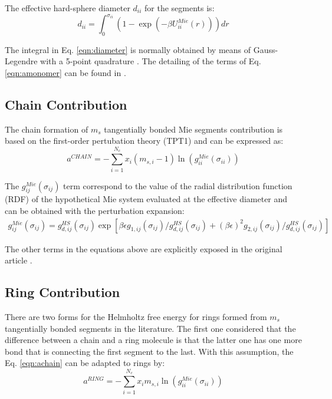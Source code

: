 The effective hard-sphere diameter $d_{ii}$ for the segments is:
\begin{equation}
d_{ii} =\int_{0}^{\sigma_{ii}} ( 1 - \exp(-\beta U^{Mie}_{ii}(r)) ) dr
\label{eqn:diameter}
\end{equation}


The integral in Eq. \eqref{eqn:diameter} is normally obtained by means of Gauss-Legendre with a 5-point quadrature \cite{papa2014}. The detailing of the terms of Eq. \eqref{eqn:amonomer} can be found in .

\subsection{Chain Contribution}
The chain formation of $m_{s}$ tangentially bonded Mie segments contribution is based on the first-order pertubation theory (TPT1)  \cite{papa2014} and can be expressed as:
\begin{equation}
a^{CHAIN} =-\sum_{i=1}^{N_{c}} x_{i}(m_{s,i} - 1)\ln(g_{ii}^{Mie}(\sigma_{ii}))
\label{eqn:achain}
\end{equation}


The $g_{ij}^{Mie}(\sigma_{ij})$ term correspond to the value of the radial distribution function (RDF) of the hypothetical Mie system evaluated at the effective diameter and can be obtained with the perturbation expansion:
\begin{equation}
\begin{aligned}
g_{ij}^{Mie}(\sigma_{ij}) =g_{d,ij}^{HS}(\sigma_{ij})\exp[\beta\epsilon g_{1,ij}(\sigma_{ij})/g_{d,ij}^{HS}(\sigma_{ij}) + (\beta\epsilon)^{2} g_{2,ij}(\sigma_{ij})/g_{d,ij}^{HS}(\sigma_{ij})]
\end{aligned}
\label{eqn:gmie}
\end{equation}


The other terms in the equations above are explicitly exposed in the original article \cite{lafitte2013}. 

\subsection{Ring Contribution}
There are two forms for the Helmholtz free energy for rings formed from $m_{s}$ tangentially bonded segments in the literature. The first one  \cite{lafitte2012} considered that the difference between a chain and a ring molecule is that the latter one has one more bond that is connecting the first segment to the last. With this assumption, the Eq. \eqref{eqn:achain} can be adapted to rings by:
\begin{equation}
a^{RING} =-\sum_{i=1}^{N_{c}} x_{i}m_{s,i}\ln(g_{ii}^{Mie}(\sigma_{ii}))
\label{eqn:aringlafitte}
\end{equation}

